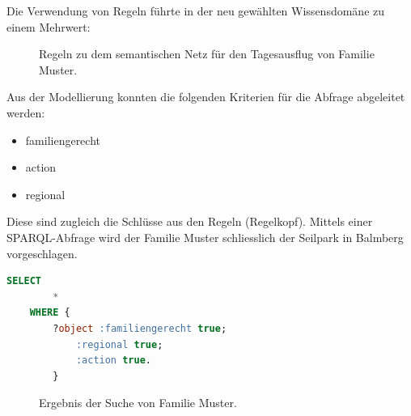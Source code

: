 Die Verwendung von Regeln führte in der neu gewählten Wissensdomäne zu einem Mehrwert:
\begin{figure}[H]
    \centering {}
    \caption{Regeln zu dem semantischen Netz für den Tagesausflug von Familie Muster.\label{fig:famMusterRegeln}\protect\footnotemark}
\end{figure}

Aus der Modellierung konnten die folgenden Kriterien für die Abfrage abgeleitet werden:

\begin{itemize}
		\item familiengerecht
		\item action
		\item regional
\end{itemize}

Diese sind zugleich die Schlüsse aus den Regeln (Regelkopf). Mittels einer SPARQL-Abfrage wird der Familie Muster schliesslich der Seilpark in Balmberg vorgeschlagen.

\begin{lstlisting}[caption={SPARQL-Abfrage um familiengerechte, regionale und actionreiche Ausflüge zu finden.},captionpos=b,language=SQL]
    SELECT
        *
    WHERE {
        ?object :familiengerecht true;
            :regional true;
            :action true.
        }
\end{lstlisting}


\begin{figure}[H]
\centering {}
\caption{Ergebnis der Suche von Familie Muster.\label{fig:famMusterOutput}\protect\footnotemark}
\end{figure}

